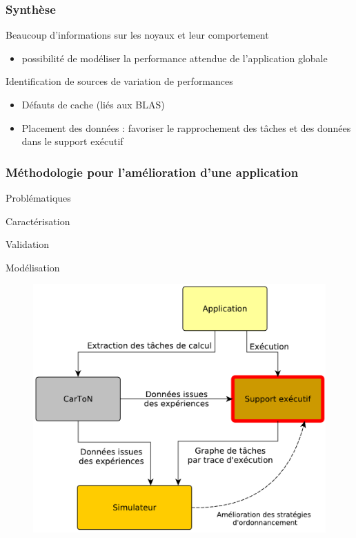 \documentclass[xcolor={usenames,dvipsnames,svgnames,table}, aspectratio=43]{beamer}
\begin{document}
\begin{frame}
\frametitle{Synthèse}

Beaucoup d'informations sur les noyaux et leur comportement

\begin{itemize}
  \item possibilité de modéliser la performance attendue de l'application globale
\end{itemize}


Identification de sources de variation de performances

\begin{itemize}
  \item Défauts de cache (liés aux BLAS)
  \item Placement des données : favoriser le rapprochement des tâches et des données dans le support exécutif
\end{itemize}


\end{frame}

\begin{frame}
  \frametitle{Méthodologie pour l'amélioration d'une application}
  \begin{minipage}[t]{0.36\linewidth}
    \begin{block}{Problématiques}
      \begin{itemize}
	{
	  \item Caractérisation
	}
	\item Validation
	{
	  \item Modélisation
	}
      \end{itemize}
    \end{block}
  \end{minipage}
      \hfill
  \begin{minipage}[t]{0.60\linewidth}
    \begin{figure}
      \includegraphics[width=\textwidth]{graph/big_picture-part2.pdf}%
    \end{figure}
  \end{minipage}
\end{frame}
\end{document}

